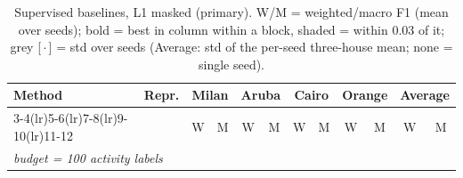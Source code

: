 \begin{table}[H]
\centering\small
\caption{Supervised baselines, L1 masked (primary). W/M = weighted/macro F1 (mean over seeds); bold = best in column within a block, shaded = within 0.03 of it; grey [\,$\cdot$\,] = std over seeds (Average: std of the per-seed three-house mean; none = single seed).}
\label{tab:base_l1_masked}
\setlength{\tabcolsep}{3.2pt}
\begin{tabular}{llcc|cc|cc|cc|cc}
\toprule
Method & Repr. & \multicolumn{2}{c}{Milan} & \multicolumn{2}{c}{Aruba} & \multicolumn{2}{c}{Cairo} & \multicolumn{2}{c}{Orange} & \multicolumn{2}{c}{Average} \\
\cmidrule(lr){3-4}\cmidrule(lr){5-6}\cmidrule(lr){7-8}\cmidrule(lr){9-10}\cmidrule(lr){11-12}
 & & W & M & W & M & W & M & W & M & W & M \\
\midrule
\multicolumn{12}{l}{\textit{budget = 100 activity labels}} \\
\midrule

\end{tabular}
\end{table}
